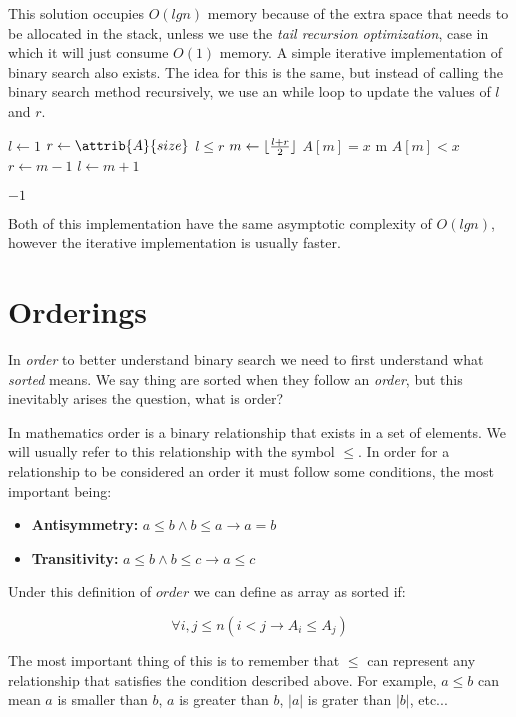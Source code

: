 \documentclass{article}
\DeclarePairedDelimiter\floor{\lfloor}{\rfloor}
\begin{document}
This solution occupies $O(lgn)$ memory because of the extra space that needs to be allocated in the stack, unless we use the \textit{tail recursion optimization}, case in which it will just consume $O(1)$ memory. A simple iterative implementation of binary search also exists. The idea for this is the same, but instead of calling the binary search method recursively, we use an while loop to update the values of $l$ and $r$.

\begin{codebox}
	\li $l \gets 1$
	\li $r \gets \attrib{A}{size}$
	\li \While $l \leq r$ \li \Do 
		$m \gets \floor{\frac{l + r}{2}}$
		\li \If $A[m] = x$ \li \Then
			\Return m
		\End
		\li \If $A[m] < x$ \li \Then
			$r \gets m - 1$
		\li \Else
			\li $l \gets m + 1$
		\End
	\End

	\li \Return $-1$
\end{codebox}

Both of this implementation have the same asymptotic complexity of $O(lgn)$, however the iterative implementation is usually faster.

\section{Orderings}

In \textit{order} to better understand binary search we need to first understand what \textit{sorted} means. We say thing are sorted when they follow an \textit{order}, but this inevitably arises the question, what is order?

In mathematics order is a binary relationship that exists in a set of elements. We will usually refer to this relationship with the symbol $\leq$. In order for a relationship to be considered an order it must follow some conditions, the most important being:

\begin{itemize}
	\item \textbf{Antisymmetry:} $a \leq b \land b \leq a \rightarrow a = b$
	\item \textbf{Transitivity:} $a \leq b \land b \leq c \rightarrow a \leq c$
\end{itemize}

Under this definition of $order$ we can define as array as sorted if:

$$\forall i, j \leq n (i < j \rightarrow A_i \leq A_j)$$

The most important thing of this is to remember that $\leq$ can represent any relationship that satisfies the condition described above. For example, $a \leq b$ can mean $a$ is smaller than $b$, $a$ is greater than $b$, $|a|$ is grater than $|b|$, etc...
\end{document}
